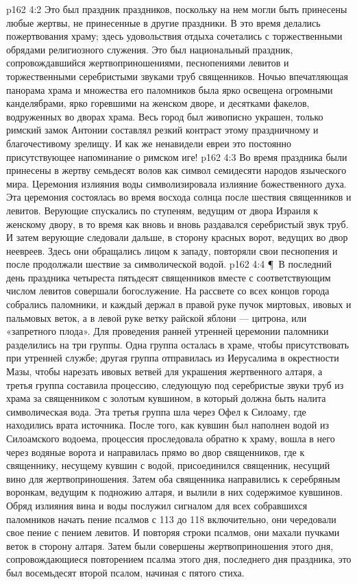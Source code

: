 \vs p162 4:2 Это был праздник праздников, поскольку на нем могли быть принесены любые жертвы, не принесенные в другие праздники. В это время делались пожертвования храму; здесь удовольствия отдыха сочетались с торжественными обрядами религиозного служения. Это был национальный праздник, сопровождавшийся жертвоприношениями, песнопениями левитов и торжественными серебристыми звуками труб священников. Ночью впечатляющая панорама храма и множества его паломников была ярко освещена огромными канделябрами, ярко горевшими на женском дворе, и десятками факелов, водруженных во дворах храма. Весь город был живописно украшен, только римский замок Антонии составлял резкий контраст этому праздничному и благочестивому зрелищу. И как же ненавидели евреи это постоянно присутствующее напоминание о римском иге!
\vs p162 4:3 Во время праздника были принесены в жертву семьдесят волов как символ семидесяти народов языческого мира. Церемония излияния воды символизировала излияние божественного духа. Эта церемония состоялась во время восхода солнца после шествия священников и левитов. Верующие спускались по ступеням, ведущим от двора Израиля к женскому двору, в то время как вновь и вновь раздавался серебристый звук труб. И затем верующие следовали дальше, в сторону красных ворот, ведущих во двор неевреев. Здесь они обращались лицом к западу, повторяли свои песнопения и после продолжали шествие за символической водой.
\vs p162 4:4 \P\ В последний день праздника четыреста пятьдесят священников вместе с соответствующим числом левитов совершали богослужение. На рассвете со всех концов города собрались паломники, и каждый держал в правой руке пучок миртовых, ивовых и пальмовых веток, а в левой руке ветку райской яблони --- цитрона, или «запретного плода». Для проведения ранней утренней церемонии паломники разделились на три группы. Одна группа осталась в храме, чтобы присутствовать при утренней службе; другая группа отправилась из Иерусалима в окрестности Мазы, чтобы нарезать ивовых ветвей для украшения жертвенного алтаря, а третья группа составила процессию, следующую под серебристые звуки труб из храма за священником с золотым кувшином, в который должна быть налита символическая вода. Эта третья группа шла через Офел к Силоаму, где находились врата источника. После того, как кувшин был наполнен водой из Силоамского водоема, процессия проследовала обратно к храму, вошла в него через водяные ворота и направилась прямо во двор священников, где к священнику, несущему кувшин с водой, присоединился священник, несущий вино для жертвоприношения. Затем оба священника направились к серебряным воронкам, ведущим к подножию алтаря, и вылили в них содержимое кувшинов. Обряд излияния вина и воды послужил сигналом для всех собравшихся паломников начать пение псалмов с 113 до 118 включительно, они чередовали свое пение с пением левитов. И повторяя строки псалмов, они махали пучками веток в сторону алтаря. Затем были совершены жертвоприношения этого дня, сопровождающиеся повторением псалма этого дня, последнего дня праздника, это был восемьдесят второй псалом, начиная с пятого стиха.
